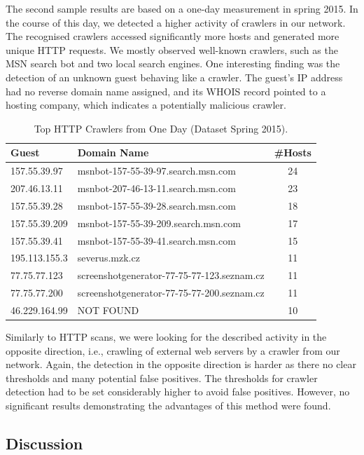 The second sample results are based on a one-day measurement in spring 2015. In the course of this day, we detected a higher activity of crawlers in our network. The recognised crawlers accessed significantly more hosts and generated more unique HTTP requests. We mostly observed well-known crawlers, such as the MSN search bot and two local search engines. One interesting finding was the detection of an unknown guest behaving like a crawler. The guest's IP address had no reverse domain name assigned, and its WHOIS record pointed to a hosting company, which indicates a potentially malicious crawler.

\begin{table}[ht]
\centering
\begin{tabular}{| l | l | c |} \hline
Guest & Domain Name & \#Hosts \\ \hline
157.55.39.97  & msnbot-157-55-39-97.search.msn.com  & 24 \\ \hline
207.46.13.11  & msnbot-207-46-13-11.search.msn.com  & 23 \\ \hline
157.55.39.28  & msnbot-157-55-39-28.search.msn.com  & 18 \\ \hline
157.55.39.209 & msnbot-157-55-39-209.search.msn.com & 17 \\ \hline
157.55.39.41  & msnbot-157-55-39-41.search.msn.com  & 15 \\ \hline
195.113.155.3 & severus.mzk.cz & 11 \\ \hline
77.75.77.123  & screenshotgenerator-77-75-77-123.seznam.cz & 11 \\ \hline
77.75.77.200  & screenshotgenerator-77-75-77-200.seznam.cz & 11 \\ \hline
46.229.164.99 & NOT FOUND & 10 \\ \hline
\end{tabular}
\caption{Top HTTP Crawlers from One Day (Dataset Spring 2015).}
\label{tab:httpsecurity-crawlers2}
\end{table}

Similarly to HTTP scans, we were looking for the described activity in the opposite direction, i.e., crawling of external web servers by a crawler from our network. Again, the detection in the opposite direction is harder as there no clear thresholds and many potential false positives. The thresholds for crawler detection had to be set considerably higher to avoid false positives. However, no significant results demonstrating the advantages of this method were found.


\subsection{Discussion}\label{subsec:httpsecurity-discussion}

